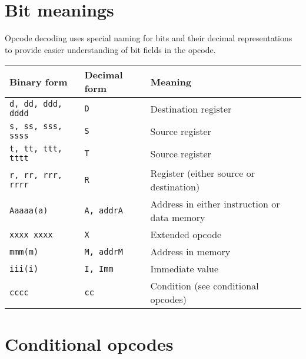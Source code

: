 \documentclass[oneside,english,a4paper,10pt,oneside,openany,final]{memoir}
\begin{document}
\pagebreak{}

\section{Bit meanings}

Opcode decoding uses special naming for bits and their decimal representations to provide easier understanding of bit fields in the opcode.

\begin{table}[H]
\centering
\begin{tabular}{|l|l|l|}
\hline
\textbf{Binary form}          & \textbf{Decimal form}          & \textbf{Meaning}                             \\ \hline
\texttt{d, dd, ddd, dddd}     & \texttt{D}                     & Destination register                         \\ \hline
\texttt{s, ss, sss, ssss}     & \texttt{S}                     & Source register                              \\ \hline
\texttt{t, tt, ttt, tttt}     & \texttt{T}                     & Source register                              \\ \hline
\texttt{r, rr, rrr, rrrr}     & \texttt{R}                     & Register (either source or destination)      \\ \hline
\texttt{Aaaaa(a)}             & \texttt{A, addrA}              & Address in either instruction or data memory \\ \hline
\texttt{xxxx xxxx}            & \texttt{X}                     & Extended opcode                              \\ \hline
\texttt{mmm(m)}               & \texttt{M, addrM}              & Address in memory                            \\ \hline
\texttt{iii(i)}               & \texttt{I, Imm}                & Immediate value                              \\ \hline
\texttt{cccc}                 & \texttt{cc}                    & Condition (see conditional opcodes)          \\ \hline
\end{tabular}
\end{table}

\pagebreak{}

\section{Conditional opcodes}
\end{document}
